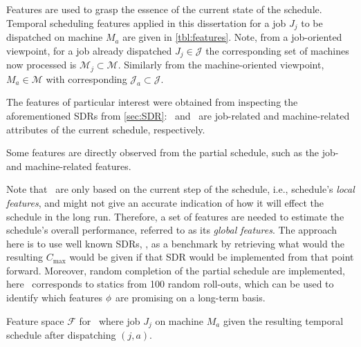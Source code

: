 Features are used to grasp the essence of the current state of the schedule. Temporal scheduling features applied in this dissertation for a job $J_j$ to be dispatched on machine $M_a$ are given in \cref{tbl:features}. 
Note, from a job-oriented viewpoint, for a job already dispatched $J_j\in\mathcal{J}$ the corresponding set of machines now processed is $\mathcal{M}_j\subset\mathcal{M}$. Similarly from the machine-oriented viewpoint, $M_a\in\mathcal{M}$ with corresponding $\mathcal{J}_a\subset\mathcal{J}$. 

The features of particular interest were obtained from inspecting the aforementioned SDRs from \cref{sec:SDR}:  
\phiJobRelated\ and \phiMacRelated\ are job-related and machine-related attributes of the current schedule, respectively. 

Some features are directly observed from the partial schedule, such as the job- and machine-related features. 

Note that \phiLocalRelated\ are only based on the current step of the schedule, 
i.e., schedule's \emph{local features}, and might not give an accurate 
indication of how it will effect the schedule in the long run. Therefore, a set 
of features are needed to estimate the schedule's overall performance, referred 
to as its \emph{global features}. The approach here is to use well known SDRs, 
\phiSDRRelated, as a benchmark by retrieving what would the resulting 
$C_{\max}$ would be given if that SDR would be implemented from that point 
forward. Moreover, random completion of the partial schedule are implemented, 
here \phiRNDRelated\ corresponds to statics from 100 random roll-outs, which 
can be used to identify which features ${\mathbf{\phi}}$ are promising on a long-term 
basis.  


\begin{table} \centering 
	\caption[Feature space $\mathcal{F}$ for \JSP]{Feature space $\mathcal{F}$ for \JSP\ where job $J_j$ on machine $M_a$ given the resulting temporal schedule after dispatching $(j,a)$.}
	\label{tbl:features}
	
\end{table}



